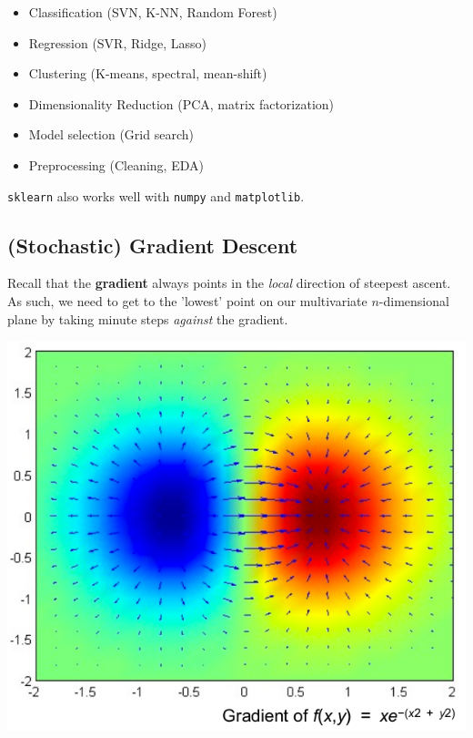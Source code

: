 \documentclass[english, 10pt]{article}
\begin{document}
\begin{itemize}
	\item Classification (SVN, K-NN, Random Forest)
	\item Regression (SVR, Ridge, Lasso)
	\item Clustering (K-means, spectral, mean-shift)
	\item Dimensionality Reduction (PCA, matrix factorization)
	\item Model selection (Grid search)
	\item Preprocessing (Cleaning, EDA)
\end{itemize}

\texttt{sklearn} also works well with \texttt{numpy} and \texttt{matplotlib}.

\subsection{(Stochastic) Gradient Descent}

Recall that the \textbf{gradient} always points in the \textit{local} direction of steepest ascent.\\

As such, we need to get to the 'lowest' point on our multivariate $n$-dimensional plane by taking minute steps \textit{against} the gradient.

\begin{center}
	\includegraphics[scale=0.35]{img/gradient.png} 
\end{center}
\end{document}

